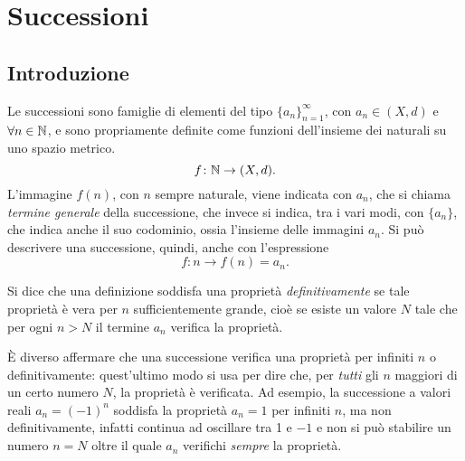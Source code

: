 \chapter{Successioni}
\section{Introduzione}
Le successioni sono famiglie di elementi del tipo $\{a_n\}_{n=1}^{\infty}$, con $a_n\in (X,d)$ e $\forall n\in\mathbb{N}$, e sono propriamente definite come funzioni dell'insieme dei naturali su uno spazio metrico.
\[
f\colon\mathbb{N}\to (X,d).
\]
L'immagine $f(n)$, con $n$ sempre naturale, viene indicata con $a_n$, che si chiama \emph{termine generale} della successione, che invece si indica, tra i vari modi, con $\{a_n\}$, che indica anche il suo codominio, ossia l'insieme delle immagini $a_n$.
Si può descrivere una successione, quindi, anche con l'espressione
\[
f\colon n\to f(n)=a_n.
\]
\begin{definizione}
Si dice che una definizione soddisfa una proprietà \emph{definitivamente} se tale proprietà è vera per $n$ sufficientemente grande, cioè se esiste un valore $N$ tale che per ogni $n>N$ il termine $a_n$ verifica la proprietà.
\end{definizione}
È diverso affermare che una successione verifica una proprietà per infiniti $n$ o definitivamente: quest'ultimo modo si usa per dire che, per \emph{tutti} gli $n$ maggiori di un certo numero $N$, la proprietà è verificata. Ad esempio, la successione a valori reali $a_n=(-1)^n$ soddisfa la proprietà $a_n=1$ per infiniti $n$, ma non definitivamente, infatti continua ad oscillare tra 1 e $-1$ e non si può stabilire un numero $n=N$ oltre il quale $a_n$ verifichi \textit{sempre} la proprietà.

